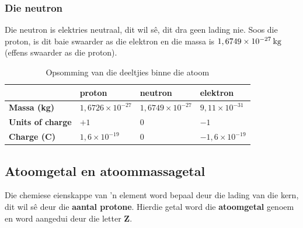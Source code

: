             \subsubsection*{Die neutron}
            \nopagebreak
          \label{m38745*id254468}
Die neutron is elektries neutraal, dit wil s\^{e}, dit dra geen lading nie. Soos die proton, is dit baie swaarder as die elektron en die massa is $1,6749\ensuremath{\times}{10}^{-27}\phantom{\rule{2pt}{0ex}}\text{kg}$ (effens swaarder as die proton).\par 
\label{m38745*notfhsst!!!underscore!!!id214}
          \begin{table}[H]
        \begin{center}
      \label{m38745*uid14}
    \noindent
      \begin{tabular}{|l|l|l|l|}\hline
         &
                    \textbf{proton}
                   &
                    \textbf{neutron}
                   &
                    \textbf{elektron} \\ \hline
                    \textbf{Massa (kg)}
                   &
        $1,6726\ensuremath{\times}{10}^{-27}$ &
        $1,6749\ensuremath{\times}{10}^{-27}$ &
        $9,11\ensuremath{\times}{10}^{-31}$ \\ \hline
                    \textbf{Units of charge}
                   &
        $+1$ &
        $0$ &
        $-1$ \\ \hline
                    \textbf{Charge (C)}
                   &
        $1,6\ensuremath{\times}{10}^{-19}$ &
        $0$ &
        $-1,6\ensuremath{\times}{10}^{-19}$ \\ \hline
    \end{tabular}
      \end{center}
    \caption{Opsomming van die deeltjies binne die atoom}
\end{table}
    \par
    \label{m38745*cid5}
            \subsection*{Atoomgetal en atoommassagetal}
            \nopagebreak
      \label{m38745*id255805}
Die chemiese eienskappe van 'n element word bepaal deur die lading van die kern, dit wil sê deur die \textbf{aantal protone}. Hierdie getal word die \textbf{atoomgetal} genoem en word aangedui deur die letter \textbf{Z}.\par 


